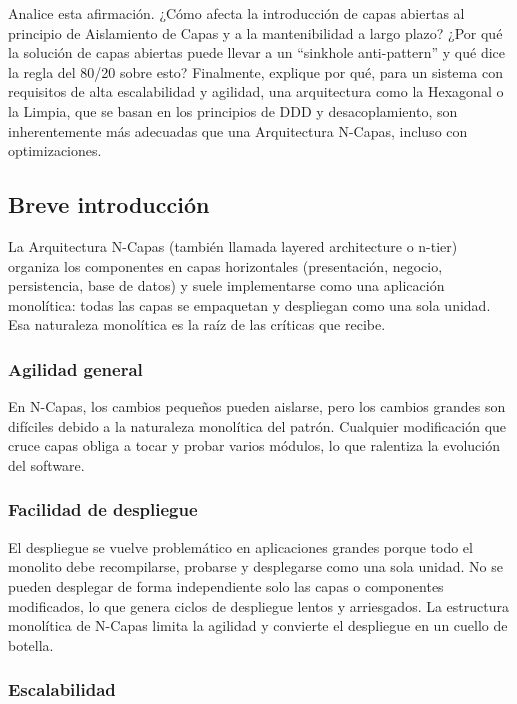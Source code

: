 \documentclass[12pt, a4paper]{article}
\begin{document}
        Analice esta afirmación. ¿Cómo afecta la introducción de capas abiertas al principio de Aislamiento de Capas y a la mantenibilidad a largo plazo? ¿Por qué la solución de capas abiertas puede llevar a un ``sinkhole anti-pattern'' y qué dice la regla del 80/20 sobre esto? Finalmente, explique por qué, para un sistema con requisitos de alta escalabilidad y agilidad, una arquitectura como la Hexagonal o la Limpia, que se basan en los principios de DDD y desacoplamiento, son inherentemente más adecuadas que una Arquitectura N-Capas, incluso con optimizaciones.

        \subsection{Breve introducción}

        La Arquitectura N-Capas (también llamada layered architecture o n-tier) organiza los componentes en capas horizontales (presentación, negocio, persistencia, base de datos) y suele implementarse como una aplicación monolítica: todas las capas se empaquetan y despliegan como una sola unidad. Esa naturaleza monolítica es la raíz de las críticas que recibe.
        
        \subsubsection*{Agilidad general}
        
        En N-Capas, los cambios pequeños pueden aislarse, pero los cambios grandes son difíciles debido a la naturaleza monolítica del patrón. Cualquier modificación que cruce capas obliga a tocar y probar varios módulos, lo que ralentiza la evolución del software.
        
        \subsubsection*{Facilidad de despliegue}
        
        El despliegue se vuelve problemático en aplicaciones grandes porque todo el monolito debe recompilarse, probarse y desplegarse como una sola unidad. No se pueden desplegar de forma independiente solo las capas o componentes modificados, lo que genera ciclos de despliegue lentos y arriesgados. La estructura monolítica de N-Capas limita la agilidad y convierte el despliegue en un cuello de botella.
        
        \subsubsection*{Escalabilidad}
        
\end{document}
